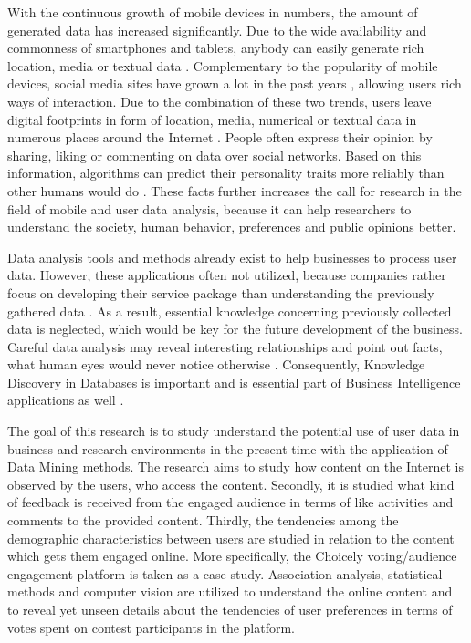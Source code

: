     With the continuous growth of mobile devices in numbers, the amount of generated data has increased significantly. Due to the wide availability and commonness of smartphones and tablets, anybody can easily generate rich location, media or textual data \cite{jang2016teensengagemorewithfewerphotos}. Complementary to the popularity of mobile devices, social media sites have grown a lot in the past years \cite{ottoni2013ladies, hu2014we, bakhshi2014faces, waheed2017investigation}, allowing users rich ways of interaction. Due to the combination of these two trends, users leave digital footprints in form of location, media, numerical or textual data in numerous places around the Internet \cite{youyou2015computer}. People often express their opinion by sharing, liking or commenting on data over social networks. Based on this information, algorithms can predict their personality traits more reliably than other humans would do \cite{youyou2015computer}. These facts further increases the call for research in the field of mobile and user data analysis, because it can help researchers to understand the society, human behavior, preferences and public opinions better.

    Data analysis tools and methods already exist to help businesses to process user data. However, these applications often not utilized, because companies rather focus on developing their service package than understanding the previously gathered data \cite{inmon2007tapping, bigdatamanagementrevolution}. As a result, essential knowledge concerning previously collected data is neglected, which would be key for the future development of the business. Careful data analysis may reveal interesting relationships and point out facts, what human eyes would never notice otherwise \cite{bigdatamanagementrevolution}. Consequently, Knowledge Discovery in Databases is important and is essential part of Business Intelligence applications as well \cite{zarsky2002mine, bigdatamanagementrevolution}. 
    
    The goal of this research is to study understand the potential use of user data in business and research environments in the present time with the application of Data Mining methods. The research aims to study how content on the Internet is observed by the users, who access the content. Secondly, it is studied what kind of feedback is received from the engaged audience in terms of like activities and comments to the provided content. Thirdly, the tendencies among the demographic characteristics between users are studied in relation to the content which gets them engaged online. More specifically, the Choicely voting/audience engagement platform is taken as a case study. Association analysis, statistical methods and computer vision are utilized to understand the online content and to reveal yet unseen details about the tendencies of user preferences in terms of votes spent on contest participants in the platform.
    
